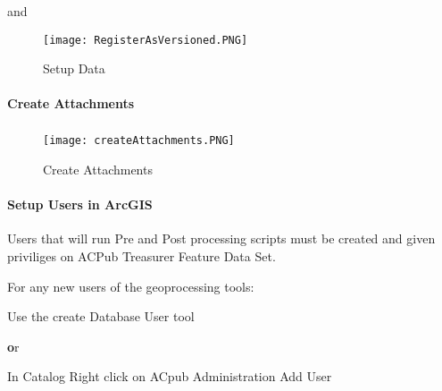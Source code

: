  \vspace{.2in}

 and
 \vspace{.2in}

 \vspace{.2in}

 \begin{figure}[h!]
 \centering
     \texttt{[image: RegisterAsVersioned.PNG]}
 \caption{Setup Data}
 \end{figure}
 \clearpage
 \paragraph[Create Attachments]{\Large Create Attachments\texorpdfstring{\\}{}}

 \vspace{.3in}

 \subparagraph*{}
 \begin{figure}[h!]
 \centering
     \texttt{[image: createAttachments.PNG]}
 \caption{Create Attachments}
 \end{figure}
 \clearpage
 \paragraph[Setup Users in ArcGIS]{\Large Setup Users in ArcGIS\texorpdfstring{\\}{}}

 Users that will run Pre and Post processing scripts must be created and given priviliges on ACPub Treasurer Feature Data Set.
 \vspace{.35in}

 \noindent For any new users of the geoprocessing tools:

 \vspace{.15in}

 Use the create Database User tool
  \vspace{.15in}

 {\textbf or}

 \vspace{.15in}

In Catalog {\rtArrow} Right click on ACpub {\rtArrow} Administration {\rtArrow} Add User

